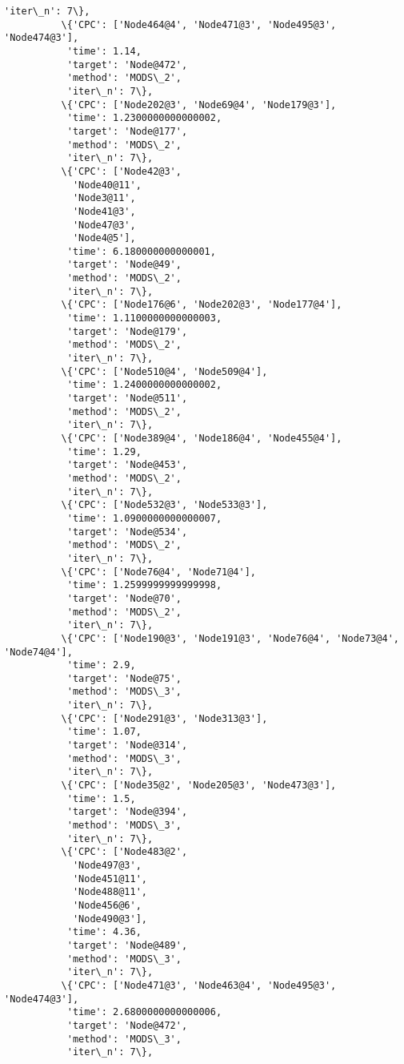 \documentclass[11pt]{article}
\begin{document}
\begin{Verbatim}[commandchars=\\\{\}]
           'iter\_n': 7\},
          \{'CPC': ['Node464@4', 'Node471@3', 'Node495@3', 'Node474@3'],
           'time': 1.14,
           'target': 'Node@472',
           'method': 'MODS\_2',
           'iter\_n': 7\},
          \{'CPC': ['Node202@3', 'Node69@4', 'Node179@3'],
           'time': 1.2300000000000002,
           'target': 'Node@177',
           'method': 'MODS\_2',
           'iter\_n': 7\},
          \{'CPC': ['Node42@3',
            'Node40@11',
            'Node3@11',
            'Node41@3',
            'Node47@3',
            'Node4@5'],
           'time': 6.180000000000001,
           'target': 'Node@49',
           'method': 'MODS\_2',
           'iter\_n': 7\},
          \{'CPC': ['Node176@6', 'Node202@3', 'Node177@4'],
           'time': 1.1100000000000003,
           'target': 'Node@179',
           'method': 'MODS\_2',
           'iter\_n': 7\},
          \{'CPC': ['Node510@4', 'Node509@4'],
           'time': 1.2400000000000002,
           'target': 'Node@511',
           'method': 'MODS\_2',
           'iter\_n': 7\},
          \{'CPC': ['Node389@4', 'Node186@4', 'Node455@4'],
           'time': 1.29,
           'target': 'Node@453',
           'method': 'MODS\_2',
           'iter\_n': 7\},
          \{'CPC': ['Node532@3', 'Node533@3'],
           'time': 1.0900000000000007,
           'target': 'Node@534',
           'method': 'MODS\_2',
           'iter\_n': 7\},
          \{'CPC': ['Node76@4', 'Node71@4'],
           'time': 1.2599999999999998,
           'target': 'Node@70',
           'method': 'MODS\_2',
           'iter\_n': 7\},
          \{'CPC': ['Node190@3', 'Node191@3', 'Node76@4', 'Node73@4', 'Node74@4'],
           'time': 2.9,
           'target': 'Node@75',
           'method': 'MODS\_3',
           'iter\_n': 7\},
          \{'CPC': ['Node291@3', 'Node313@3'],
           'time': 1.07,
           'target': 'Node@314',
           'method': 'MODS\_3',
           'iter\_n': 7\},
          \{'CPC': ['Node35@2', 'Node205@3', 'Node473@3'],
           'time': 1.5,
           'target': 'Node@394',
           'method': 'MODS\_3',
           'iter\_n': 7\},
          \{'CPC': ['Node483@2',
            'Node497@3',
            'Node451@11',
            'Node488@11',
            'Node456@6',
            'Node490@3'],
           'time': 4.36,
           'target': 'Node@489',
           'method': 'MODS\_3',
           'iter\_n': 7\},
          \{'CPC': ['Node471@3', 'Node463@4', 'Node495@3', 'Node474@3'],
           'time': 2.6800000000000006,
           'target': 'Node@472',
           'method': 'MODS\_3',
           'iter\_n': 7\},

\end{Verbatim}
\end{document}
